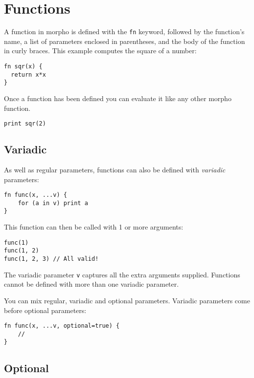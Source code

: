 \hypertarget{functions}{%
\section{Functions}\label{functions}}

A function in morpho is defined with the \texttt{fn} keyword, followed
by the function's name, a list of parameters enclosed in parentheses,
and the body of the function in curly braces. This example computes the
square of a number:

\begin{lstlisting}
fn sqr(x) {
  return x*x
}
\end{lstlisting}

Once a function has been defined you can evaluate it like any other
morpho function.

\begin{lstlisting}
print sqr(2)
\end{lstlisting}

\hypertarget{variadic}{%
\subsection{Variadic}\label{variadic}}

As well as regular parameters, functions can also be defined with
\emph{variadic} parameters:

\begin{lstlisting}
fn func(x, ...v) {
    for (a in v) print a
}
\end{lstlisting}

This function can then be called with 1 or more arguments:

\begin{lstlisting}
func(1)
func(1, 2)
func(1, 2, 3) // All valid! 
\end{lstlisting}

The variadic parameter \texttt{v} captures all the extra arguments
supplied. Functions cannot be defined with more than one variadic
parameter.

You can mix regular, variadic and optional parameters. Variadic
parameters come before optional parameters:

\begin{lstlisting}
fn func(x, ...v, optional=true) {
    // 
}
\end{lstlisting}

\hypertarget{optional}{%
\subsection{Optional}\label{optional}}

